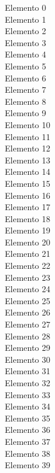 \documentclass[preview]{standalone}
\begin{document}
Elemento 0\\Elemento 1\\Elemento 2\\Elemento 3\\Elemento 4\\Elemento 5\\Elemento 6\\Elemento 7\\Elemento 8\\Elemento 9\\Elemento 10\\Elemento 11\\Elemento 12\\Elemento 13\\Elemento 14\\Elemento 15\\Elemento 16\\Elemento 17\\Elemento 18\\Elemento 19\\Elemento 20\\Elemento 21\\Elemento 22\\Elemento 23\\Elemento 24\\Elemento 25\\Elemento 26\\Elemento 27\\Elemento 28\\Elemento 29\\Elemento 30\\Elemento 31\\Elemento 32\\Elemento 33\\Elemento 34\\Elemento 35\\Elemento 36\\Elemento 37\\Elemento 38\\Elemento 39\\
\end{document}
